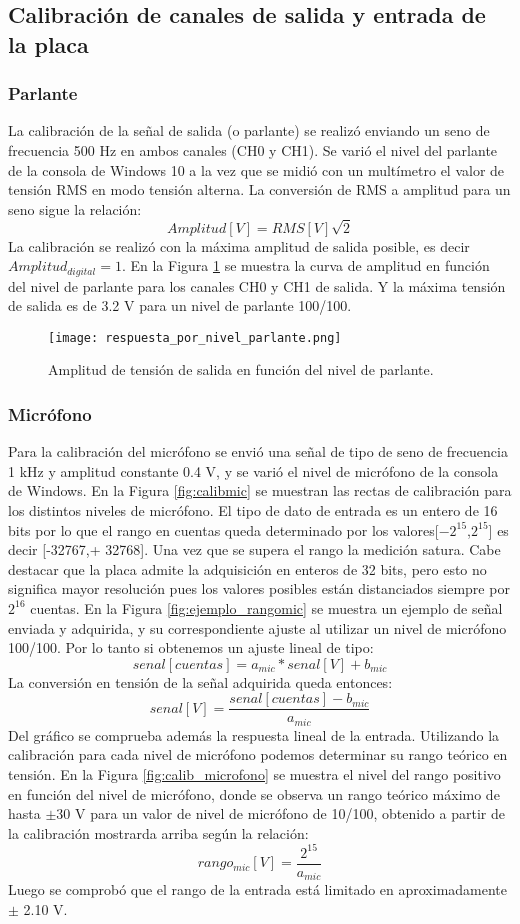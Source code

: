 \documentclass[a4paper, 11pt]{article}
\begin{document}
\subsection*{Calibración de canales de salida y entrada de la placa}
\subsubsection*{Parlante}
La calibración de la señal de salida (o parlante) se realizó enviando un seno de frecuencia 500 Hz en ambos canales (CH0 y CH1). Se varió el nivel del parlante de la consola de Windows 10 a la vez que se midió con un multímetro el valor de tensión RMS en modo tensión alterna. La conversión de RMS a amplitud para un seno sigue la relación:
\[
Amplitud[V]=RMS[V]{\sqrt2}
\]
La calibración se realizó con la máxima amplitud de salida posible, es decir $Amplitud_{digital}=1$. En la Figura \ref{fig:calib_parlante} se muestra la curva de amplitud en función del nivel de parlante para los canales CH0 y CH1 de salida. Y la máxima tensión de salida es de 3.2 V para un nivel de parlante 100/100.

\begin{figure} [H]
\centering
\texttt{[image: respuesta\_por\_nivel\_parlante.png]}
\caption{Amplitud de tensión de salida en función del nivel de parlante.\label{fig:calib_parlante}}
\end{figure} 

\subsubsection*{Micrófono}
Para la calibración del micrófono se envió una señal de tipo de seno de frecuencia 1 kHz y amplitud constante 0.4 V, y se varió el nivel de micrófono de la consola de Windows. En la Figura \ref{fig:calibmic} se muestran las rectas de calibración para los distintos niveles de micrófono. El tipo de dato de entrada es un entero de 16 bits por lo que el rango en cuentas queda determinado por los valores[$-2^{15}$,$2^{15}$] es decir [-32767,+ 32768]. Una vez que se supera el rango la medición satura. Cabe destacar que la placa admite la adquisición en enteros de 32 bits, pero esto no significa mayor resolución pues los valores posibles están distanciados siempre por $2^{16}$  cuentas.
En la Figura \ref{fig:ejemplo_rangomic} se muestra un ejemplo de señal enviada y adquirida, y su correspondiente ajuste al utilizar un nivel de micrófono 100/100. Por lo tanto si obtenemos un ajuste lineal de tipo:
\[
senal[cuentas]=a_{mic}*senal [V]+b_{mic}
\]
La conversión en tensión de la señal adquirida queda entonces:
\[
senal [V]=\frac{senal[cuentas]-b_{mic}}{a_{mic}}
\]
Del gráfico se comprueba además la respuesta lineal de la entrada.
Utilizando la calibración para cada nivel de micrófono podemos determinar su rango teórico en tensión. En la Figura \ref{fig:calib_microfono} se muestra el nivel del rango positivo en función del nivel de micrófono, donde se observa un rango teórico máximo de hasta $\pm$30 V para un valor de nivel de micrófono de 10/100, obtenido a partir de la calibración mostrarda arriba según la relación: 
\[
rango_{mic} [V]=\frac{2^{15}}{a_{mic}}
\]
Luego se comprobó que el rango de la entrada está limitado en aproximadamente $\pm$ 2.10 V.
\end{document}
